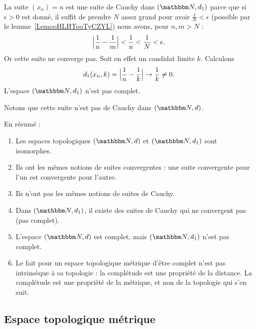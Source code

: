 \begin{example}
    La suite \( (x_n)=n\) est une suite de Cauchy dans \( (\eN,d_1)\) parce que si \( \epsilon>0\) est donné, il suffit de prendre \( N\) assez grand pour avoir \( \frac{1}{ N }<\epsilon\) (possible par le lemme~\ref{LemooHLHTooTyCZYL}) nous avons, pour \( n,m>N\) :
    \begin{equation}
        \Bigl| \frac{1}{ n }-\frac{1}{ m } \Bigr|<\frac{1}{ n }<\frac{1}{ N }<\epsilon.
    \end{equation}
    Or cette suite ne converge pas. Soit en effet un candidat limite \( k\). Calculons
    \begin{equation}
        d_1(x_n,k)= \Bigl| \frac{1}{ n }-\frac{1}{ k } \Bigr |\to \frac{1}{ k }\neq 0.
    \end{equation}
    L'espace \( (\eN,d_1)\) n'est pas complet.

    Notons que cette suite n'est pas de Cauchy dans \( (\eN,d)\).

    En résumé :
    \begin{enumerate}
        \item
            Les espaces topologiques \( (\eN,d)\) et \( (\eN,d_1)\) sont isomorphes.
        \item
            Ils ont les mêmes notions de suites convergentes : une suite convergente pour l'un est convergente pour l'autre.
        \item
            Ils n'ont pas les mêmes notions de suites de Cauchy.
        \item
            Dans \(  (\eN,d_1)  \), il existe des suites de Cauchy qui ne convergent pas (pas complet).
        \item
            L'espace \( (\eN,d)\) est complet, mais \( (\eN,d_1)\) n'est pas complet.
        \item
            Le fait pour un espace topologique métrique d'être complet n'est pas intrinsèque à sa topologie : la complétude est une propriété de la distance. La complétude est une propriété de la métrique, et non de la topologie qui s'en suit.
    \end{enumerate}
\end{example}

\subsection{Espace topologique métrique}

